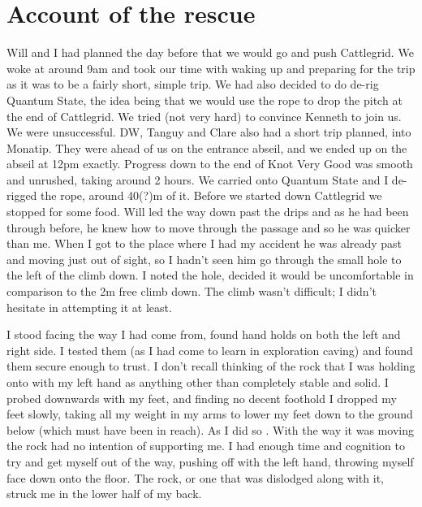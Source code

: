 \section{Account of the rescue}

    Will and I had planned the day before that we would go and push Cattlegrid. We woke at around 9am and took our time with waking up and preparing for the trip as it was to be a fairly short, simple trip. We had also decided to do de-rig Quantum State, the idea being that we would use the rope to drop the pitch at the end of Cattlegrid. We tried (not very hard) to convince Kenneth to join us. We were unsuccessful. DW, Tanguy and Clare also had a short trip planned, into Monatip. They were ahead of us on the entrance abseil, and we ended up on the abseil at 12pm exactly. Progress down to the end of Knot Very Good was smooth and unrushed, taking around 2 hours. We carried onto Quantum State and I de-rigged the rope, around 40(?)m of it. Before we started down Cattlegrid we stopped for some food. Will led the way down past the drips and as he had been through before, he knew how to move through the passage and so he was quicker than me. When I got to the place where I had my accident he was already past and moving just out of sight, so I hadn’t seen him go through the small hole to the left of the climb down. I noted the hole, decided it
    would be uncomfortable in comparison to the 2m free climb down. The climb wasn’t difficult; I didn’t hesitate in attempting it at least.

    I stood facing the way I had come from, found hand holds on both the left and right side. I tested them (as I had come to learn in exploration caving) and found them secure enough to trust. I don’t recall thinking of the rock that I was holding onto with my left hand as anything other than completely stable and solid. I probed downwards with my feet, and finding no decent foothold I dropped my feet slowly, taking all my weight in my arms to lower my feet down to the ground below (which must have been in reach). As I did so . With the way it was moving the rock had no intention of supporting me. I had enough time and cognition to try and get myself out of the way, pushing off with the left hand, throwing myself face down onto the floor. The rock, or one that was dislodged along with it, struck me in the lower half of my back. 

